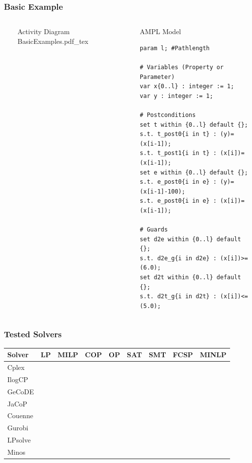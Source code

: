 \documentclass{beamer}
\begin{document}
\begin{frame}[fragile]
\frametitle{Basic Example}
\begin{columns}
  \ 
	\begin{block}{Activity Diagram} 
	\def\svgwidth{\textwidth}
	\scriptsize
	{BasicExamples.pdf_tex}
	\end{block} 
\column{.56\textwidth} \ 
	\begin{block}{AMPL Model} 
		\begin{lstlisting}[basicstyle=\ttfamily\scriptsize,language=ampl]
param l; #Pathlength

# Variables (Property or Parameter)
var x{0..l} : integer := 1;
var y : integer := 1;

# Postconditions
set t within {0..l} default {};
s.t. t_post0{i in t} : (y)=(x[i-1]);
s.t. t_post1{i in t} : (x[i])=(x[i-1]);
set e within {0..l} default {};
s.t. e_post0{i in e} : (y)=(x[i-1]-100);
s.t. e_post0{i in e} : (x[i])=(x[i-1]);

# Guards
set d2e within {0..l} default {};
s.t. d2e_g{i in d2e} : (x[i])>=(6.0);
set d2t within {0..l} default {};
s.t. d2t_g{i in d2t} : (x[i])<=(5.0);
\end{lstlisting}
	\end{block} 
\end{columns}
\end{frame}

\begin{frame}
\frametitle{Tested Solvers}
\begin{center}
\begin{tabular}{l r r r r r r r r}
Solver & LP & MILP & COP & OP & SAT & SMT & FCSP & MINLP\\
\hline
Cplex & \checkmark & \checkmark & & & & & &\\
IlogCP\cite{ilogcp} & \checkmark & \checkmark & & & \checkmark & \checkmark & \checkmark &\\
GeCoDE\cite{gecode} & & & & &\checkmark & \checkmark & \checkmark &\\
JaCoP & & & & &\checkmark & & \checkmark &\\
Couenne\cite{Belotti09couenne} & \checkmark & \checkmark & \checkmark & \checkmark & & & & \checkmark\\
Gurobi & \checkmark & & \checkmark & & & & &\\
LPsolve\cite{lpsolve} & \checkmark &\checkmark  & & & & & &\\
Minos &\checkmark & &\checkmark & & & & &\\
\hline
\end{tabular}\end{center}
\end{frame}
\end{document}

